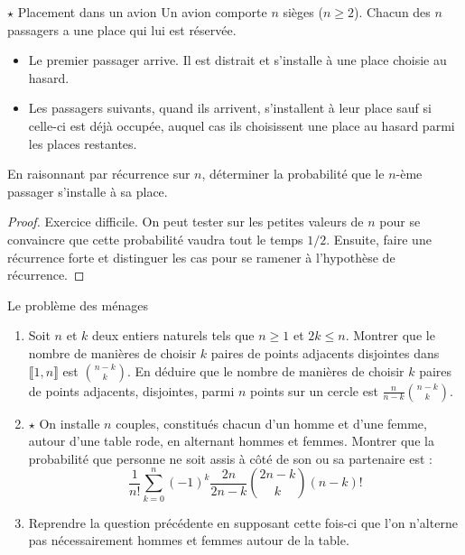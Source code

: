 \documentclass[french,a4paper]{article}
\theoremstyle{plain}
\theoremstyle{definition}
\theoremstyle{remark}
\begin{document}
\begin{ex}{$\star$ Placement dans un avion}
	Un avion comporte $n$ sièges ($n\geqslant 2$). Chacun des $n$ passagers a une place qui lui est réservée.
	\begin{itemize}
		\item Le premier passager arrive. Il est distrait et s'installe à une place choisie au hasard.
		\item Les passagers suivants, quand ils arrivent, s'installent à leur place sauf si celle-ci est déjà occupée, auquel cas ils choisissent une place au hasard parmi les places restantes.
	\end{itemize}
	En raisonnant par récurrence sur $n$, déterminer la probabilité que le $n$-ème passager s'installe à sa place.
\end{ex}
\begin{proof}
	Exercice difficile. On peut tester sur les petites valeurs de $n$ pour se convaincre que cette probabilité vaudra tout le temps $1/2$. Ensuite, faire une récurrence forte et distinguer les cas pour se ramener à l'hypothèse de récurrence.
\end{proof}

\begin{ex}{Le problème des ménages}
	\begin{enumerate}
		\item Soit $n$ et $k$ deux entiers naturels tels que $n\geqslant 1$ et $2k\leqslant n$. Montrer que le nombre de manières de choisir $k$ paires de points adjacents disjointes dans $\llbracket1,n\rrbracket$ est $\displaystyle\binom{n-k}{k}$. En déduire que le nombre de manières de choisir $k$ paires de points adjacents, disjointes, parmi $n$ points sur un cercle est $\displaystyle\frac{n}{n-k}\binom{n-k}{k}$.
		\item $\star$ On installe $n$ couples, constitués chacun d'un homme et d'une femme, autour d'une table rode, en alternant hommes et femmes. Montrer que la probabilité que personne ne soit assis à côté de son ou sa partenaire est : $$\frac{1}{n!}\sum_{k=0}^{n}(-1)^k\frac{2n}{2n-k}\binom{2n-k}{k}(n-k)!$$
		\item Reprendre la question précédente en supposant cette fois-ci que l'on n'alterne pas nécessairement hommes et femmes autour de la table.
	\end{enumerate}
\end{ex}
\end{document}

